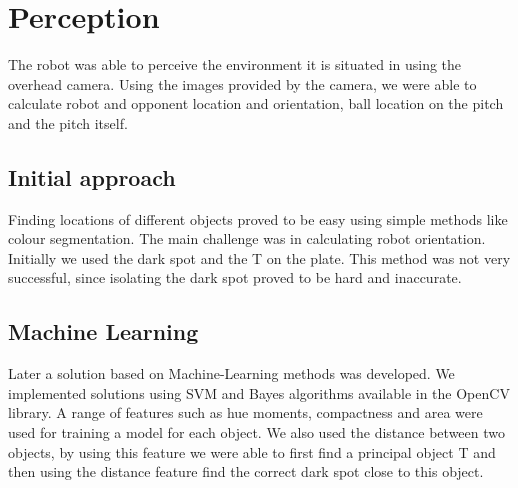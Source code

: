\section{Perception}
The robot was able to perceive the environment it is situated in using the overhead camera. Using the images provided by the camera, we were able to calculate robot and opponent location and orientation, ball location on the pitch and the pitch itself.

\subsection{Initial approach}
Finding locations of different objects proved to be easy using simple methods like colour segmentation. The main challenge was in calculating robot orientation. Initially we used the dark spot and the T on the plate. This method was not very successful, since isolating the dark spot proved to be hard and inaccurate.
\subsection{Machine Learning}
Later a solution based on Machine-Learning methods was developed. We implemented solutions using SVM and Bayes algorithms available in the OpenCV library. A range of features such as hue moments, compactness and area were used for training a model for each object. We also used the distance between two objects, by using this feature we were able to first find a principal object T and then using the distance feature find the correct dark spot close to this object.
